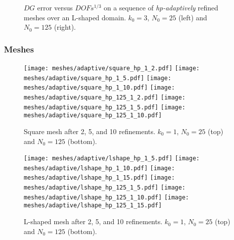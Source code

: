 \begin{figure}[!ht]
    \begin{subfigure}[b]{0.45\textwidth}
		
	\end{subfigure}
	\hfill
	\begin{subfigure}[b]{0.45\textwidth}
		
	\end{subfigure}
    \caption{$DG$ error versus $DOFs^{1/3}$ on a sequence of \textit{hp-adaptively} refined meshes over an L-shaped domain. $k_0 = 3$, $N_0 = 25$ (left) and $N_0 = 125$ (right).}
\end{figure}

\newpage
\subsubsection{Meshes}

\begin{figure}[!ht]
	\centering
    \texttt{[image: meshes/adaptive/square\_hp\_1\_2.pdf]}
	\texttt{[image: meshes/adaptive/square\_hp\_1\_5.pdf]}
	\texttt{[image: meshes/adaptive/square\_hp\_1\_10.pdf]}
    \texttt{[image: meshes/adaptive/square\_hp\_125\_1\_2.pdf]}
	\texttt{[image: meshes/adaptive/square\_hp\_125\_1\_5.pdf]}
	\texttt{[image: meshes/adaptive/square\_hp\_125\_1\_10.pdf]}
    \caption{Square mesh after 2, 5, and 10 refinements. $k_0 = 1$, $N_0 = 25$ (top) and $N_0 = 125$ (bottom).}
\end{figure}

\begin{figure}[!ht]
	\centering
	\texttt{[image: meshes/adaptive/lshape\_hp\_1\_5.pdf]}
	\texttt{[image: meshes/adaptive/lshape\_hp\_1\_10.pdf]}
	\texttt{[image: meshes/adaptive/lshape\_hp\_1\_15.pdf]}
    \texttt{[image: meshes/adaptive/lshape\_hp\_125\_1\_5.pdf]}
	\texttt{[image: meshes/adaptive/lshape\_hp\_125\_1\_10.pdf]}
	\texttt{[image: meshes/adaptive/lshape\_hp\_125\_1\_15.pdf]}
    \caption{L-shaped mesh after 2, 5, and 10 refinements. $k_0 = 1$, $N_0 = 25$ (top) and $N_0 = 125$ (bottom).}
\end{figure}

